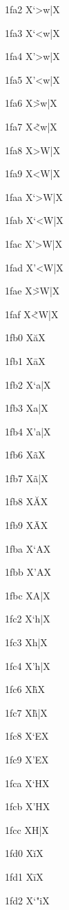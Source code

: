 \documentclass[11pt]{article}
\begin{document}
1fa2 X{\textgreek{`>w|}}X

1fa3 X{\textgreek{`<w|}}X

1fa4 X{\textgreek{'>w|}}X

1fa5 X{\textgreek{'<w|}}X

1fa6 X{\textgreek{\~{>w}|}}X

1fa7 X{\textgreek{\~{<w}|}}X

1fa8 X{\textgreek{>W|}}X

1fa9 X{\textgreek{<W|}}X

1faa X{\textgreek{`>W|}}X

1fab X{\textgreek{`<W|}}X

1fac X{\textgreek{'>W|}}X

1fad X{\textgreek{'<W|}}X

1fae X{\textgreek{\~{>W}|}}X

1faf X{\textgreek{\~{<W}|}}X

1fb0 X{\textgreek{\u{a}}}X

1fb1 X{\textgreek{\={a}}}X

1fb2 X{\textgreek{`a|}}X

1fb3 X{\textgreek{a|}}X

1fb4 X{\textgreek{'a|}}X

1fb6 X{\textgreek{\~{a}}}X

1fb7 X{\textgreek{\~{a}|}}X

1fb8 X{\textgreek{\u{A}}}X

1fb9 X{\textgreek{\={A}}}X

1fba X{\textgreek{`A}}X

1fbb X{\textgreek{'A}}X

1fbc X{\textgreek{A|}}X

1fc2 X{\textgreek{`h|}}X

1fc3 X{\textgreek{h|}}X

1fc4 X{\textgreek{'h|}}X

1fc6 X{\textgreek{\~{h}}}X

1fc7 X{\textgreek{\~{h}|}}X

1fc8 X{\textgreek{`E}}X

1fc9 X{\textgreek{'E}}X

1fca X{\textgreek{`H}}X

1fcb X{\textgreek{'H}}X

1fcc X{\textgreek{H|}}X

1fd0 X{\textgreek{\u{i}}}X

1fd1 X{\textgreek{\={i}}}X

1fd2 X{\textgreek{`"i}}X
\end{document}
